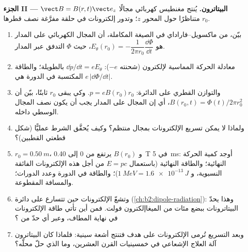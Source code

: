 \begin{problem}
\medskip
\noindent\textbf{الجزء II --- البيتاترون.}
يُنتج مغنطيس كهربائي مجالًا $\vect B = B(r, t)\vect e_z$ متناظرًا
حول المحور $z$؛ وتدور إلكترونات في حلقة مفرَّغة نصف قطرها $r_0$.
\begin{enumerate}[resume]
  \item بيّن، من ماكسويل--فاراداي في الصيغة المكاملة، أن
        المجال الكهربائي على المدار هو $E_\theta(r_0) = -\dfrac1{2\pi r_0}
        \dfrac{\dd\Phi}{\dd t}$، حيث $\Phi$ التدفق عبر المدار.
  \item معادلة الحركة المماسية لإلكترون (شحنته $-e$):
        $\dd p/\dd t = eE_\theta$ بالطويلة؛ والطاقة المكتسبة في الدورة هي
        $e\,|\dd\Phi/\dd t|$.
  \item والتوازن القطري على الدائرة: $p = eB(r_0)r_0$. وكي يبقى $r_0$
        ثابتًا، بيّن أن $B(r_0, t) = \Phi(t)/2\pi r_0^2$، أي إن
        المجال على المدار يجب أن يكون نصف المجال الوسطي داخله.
  \item ولماذا لا يمكن تسريع الإلكترونات بمجال منتظم؟
        وكيف يُحقَّق الشرط عمليًّا (شكل قطعتي
        القطبين)؟
  \item $r_0 = \qty{0.50}{m}$، و $B(r_0)$ يرتفع من $0$ إلى \qty{0.40}{T} في
        \qty{5}{ms}: أوجد كمية الحركة النهائية؛ والطاقة النهائية (باستعمال $E = pc$ من أجل هذه
        الإلكترونات الفائقة النسبوية، و $\qty{1}{MeV} = \qty{1.6e-13}{J}$)؛
        والطاقة في الدورة وعدد الدورات؛ والمسافة المقطوعة.
  \item وتشعّ الإلكترونات حين تتسارع على دائرة
        (\cref{ch:b2:dipole-radiation}): وهذا يحدّ البيتاترونات ببضع
        مئات من الميغاإلكترون فولت. فمن أين تأتي طاقة الإلكترونات في نهاية المطاف،
        وعبر أي حدّ من ؟
  \item وبعد التسريع تُرمى الإلكترونات على هدف
        فتنتج أشعة سينية: فلماذا كان البيتاترون آلة العلاج
        الإشعاعي في خمسينيات القرن العشرين، وما الذي حلّ محلّه؟
\end{enumerate}


\end{problem}
